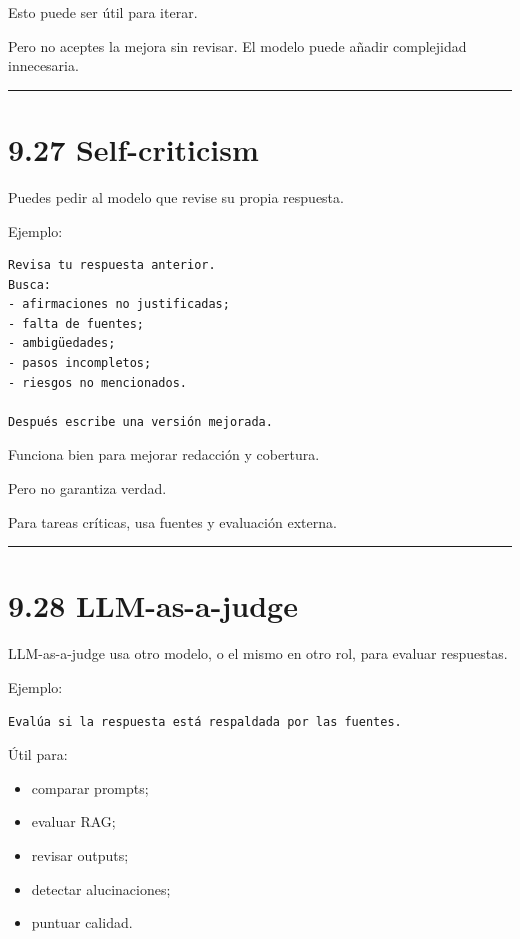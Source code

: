 Esto puede ser útil para iterar.

Pero no aceptes la mejora sin revisar. El modelo puede añadir
complejidad innecesaria.

\begin{center}\rule{0.5\linewidth}{0.5pt}\end{center}

\section{9.27 Self-criticism}\label{self-criticism}

Puedes pedir al modelo que revise su propia respuesta.

Ejemplo:

\begin{lstlisting}
Revisa tu respuesta anterior.
Busca:
- afirmaciones no justificadas;
- falta de fuentes;
- ambigüedades;
- pasos incompletos;
- riesgos no mencionados.

Después escribe una versión mejorada.
\end{lstlisting}

Funciona bien para mejorar redacción y cobertura.

Pero no garantiza verdad.

Para tareas críticas, usa fuentes y evaluación externa.

\begin{center}\rule{0.5\linewidth}{0.5pt}\end{center}

\section{9.28 LLM-as-a-judge}\label{llm-as-a-judge}

LLM-as-a-judge usa otro modelo, o el mismo en otro rol, para evaluar
respuestas.

Ejemplo:

\begin{lstlisting}
Evalúa si la respuesta está respaldada por las fuentes.
\end{lstlisting}

Útil para:

\begin{itemize}
\tightlist
\item
  comparar prompts;
\item
  evaluar RAG;
\item
  revisar outputs;
\item
  detectar alucinaciones;
\item
  puntuar calidad.
\end{itemize}

